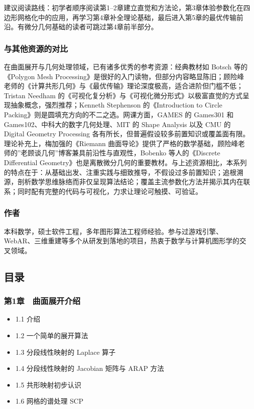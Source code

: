 \documentclass[
]{article}
\providecommand{\tightlist}{%
  \setlength{\itemsep}{0pt}\setlength{\parskip}{0pt}}
\begin{document}
建议阅读路线：初学者顺序阅读第1--2章建立直觉和方法论，第3章体验参数化在四边形网格化中的应用，再学习第4章补全理论基础，最后进入第5章的最优传输前沿。有微分几何基础的读者可跳过第4章前半部分。

\subsubsection{与其他资源的对比}\label{ux4e0eux5176ux4ed6ux8d44ux6e90ux7684ux5bf9ux6bd4}

在曲面展开与几何处理领域，已有诸多优秀的参考资源：经典教材如 Botsch
等的《Polygon Mesh
Processing》是很好的入门读物，但部分内容略显陈旧；顾险峰老师的《计算共形几何》与《最优传输》理论深度极高，适合进阶但门槛不低；Tristan
Needham
的《可视化复分析》与《可视化微分形式》以极富直觉的方式呈现抽象概念，强烈推荐；Kenneth
Stephenson 的《Introduction to Circle
Packing》则是圆填充方向的不二之选。网课方面，GAMES 的 Games301 和
Games102、中科大的数字几何处理、MIT 的 Shape Analysis 以及 CMU 的
Digital Geometry Processing
各有所长，但普遍假设较多前置知识或覆盖面有限。理论补充上，梅加强的《Riemann
曲面导论》提供了严格的数学基础，顾险峰老师的''老顾谈几何''博客兼具前沿性与直观性，Bobenko
等人的《Discrete Differential
Geometry》也是离散微分几何的重要教材。与上述资源相比，本系列的特点在于：从基础出发、注重实践与细致推导，不假设过多前置知识；追根溯源，剖析数学思维脉络而非仅呈现算法结论；覆盖主流参数化方法并揭示其内在联系；同时配有完整的代码与可视化，力求让理论可触摸、可验证。

\subsubsection{作者}\label{ux4f5cux8005}

本科数学，硕士软件工程，多年图形算法工程师经验。参与过游戏引擎、WebAR、三维重建等多个从研发到落地的项目，热衷于数学与计算机图形学的交叉领域。

\subsection{目录}\label{ux76eeux5f55}

\subsubsection{第1章　曲面展开介绍}\label{ux7b2c1ux7ae0-ux66f2ux9762ux5c55ux5f00ux4ecbux7ecd}

\begin{itemize}
\tightlist
\item
  1.1 介绍
\item
  1.2 一个简单的展开算法
\item
  1.3 分段线性映射的 Laplace 算子
\item
  1.4 分段线性映射的 Jacobian 矩阵与 ARAP 方法
\item
  1.5 共形映射初步认识
\item
  1.6 网格的谱处理 SCP
\end{itemize}
\end{document}
